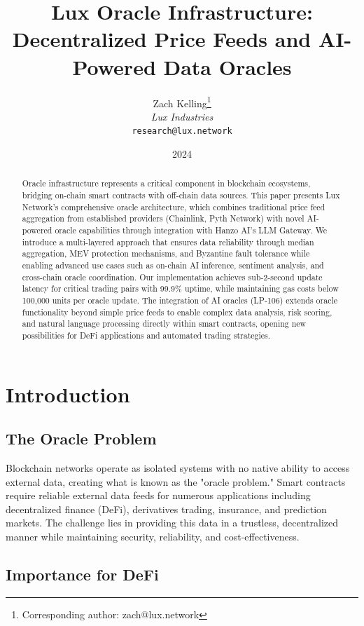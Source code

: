 \documentclass[11pt]{article}
\title{\textbf{Lux Oracle Infrastructure: Decentralized Price Feeds and AI-Powered Data Oracles}}
\author{
Zach Kelling\thanks{Corresponding author: zach@lux.network}\\
\textit{Lux Industries}\\
\texttt{research@lux.network}
}
\date{2024}
\begin{document}
\luxcoverpage
\maketitle

\begin{abstract}
Oracle infrastructure represents a critical component in blockchain ecosystems, bridging on-chain smart contracts with off-chain data sources. This paper presents Lux Network's comprehensive oracle architecture, which combines traditional price feed aggregation from established providers (Chainlink, Pyth Network) with novel AI-powered oracle capabilities through integration with Hanzo AI's LLM Gateway. We introduce a multi-layered approach that ensures data reliability through median aggregation, MEV protection mechanisms, and Byzantine fault tolerance while enabling advanced use cases such as on-chain AI inference, sentiment analysis, and cross-chain oracle coordination. Our implementation achieves sub-2-second update latency for critical trading pairs with 99.9\% uptime, while maintaining gas costs below 100,000 units per oracle update. The integration of AI oracles (LP-106) extends oracle functionality beyond simple price feeds to enable complex data analysis, risk scoring, and natural language processing directly within smart contracts, opening new possibilities for DeFi applications and automated trading strategies.
\end{abstract}

\section{Introduction}

\subsection{The Oracle Problem}

Blockchain networks operate as isolated systems with no native ability to access external data, creating what is known as the "oracle problem." Smart contracts require reliable external data feeds for numerous applications including decentralized finance (DeFi), derivatives trading, insurance, and prediction markets. The challenge lies in providing this data in a trustless, decentralized manner while maintaining security, reliability, and cost-effectiveness.

\subsection{Importance for DeFi}
\end{document}
